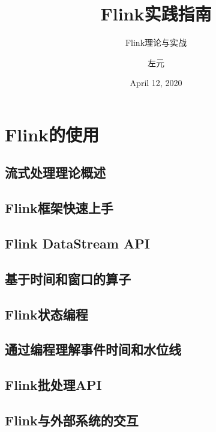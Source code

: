 \documentclass[cn,11pt,chinese]{elegantbook}
\title{Flink实践指南}
\subtitle{Flink理论与实战}
\author{左元}
\institute{尚硅谷}
\date{April 12, 2020}
\begin{document}

\maketitle
\frontmatter

\tableofcontents

\mainmatter
\part{Flink的使用}

\chapter{流式处理理论概述}

\chapter{Flink框架快速上手}


\chapter{Flink DataStream API}

\chapter{基于时间和窗口的算子}

\chapter{Flink状态编程}


\chapter{通过编程理解事件时间和水位线}

\chapter{Flink批处理API}

\chapter{Flink与外部系统的交互}
\end{document}
